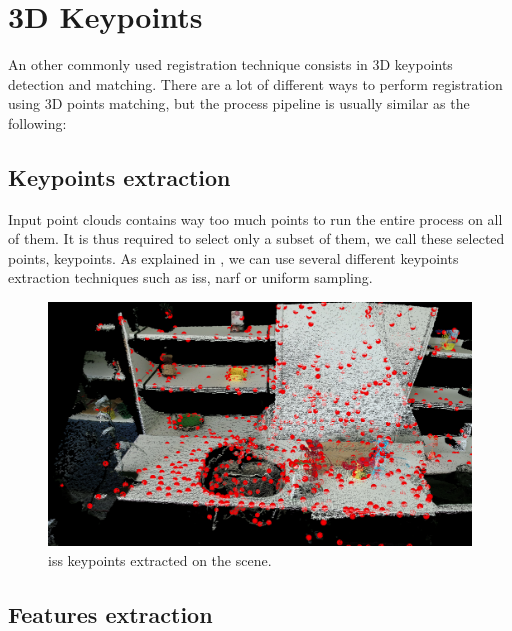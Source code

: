 \section{3D Keypoints}

An other commonly used registration technique consists in 3D keypoints detection and matching. 
There are a lot of different ways to perform registration using 3D points matching, but the process pipeline is usually similar as the following:

\subsection{Keypoints extraction}

    Input point clouds contains way too much points to run the entire process on all of them. It is thus required to select only a subset of them, we call these selected points, keypoints. As explained in \cite{pcl_feat}, we can use several different keypoints extraction techniques such as \acrshort{iss}, \acrshort{narf} or uniform sampling. \\
    
    \begin{figure}[h!]
        \centering
        \includegraphics[width=\textwidth]{images/iss_keypoints.png}
        \caption{\acrshort{iss} keypoints extracted on the scene.}
        \label{fig:iss_kp}
    \end{figure}

\subsection{Features extraction}

